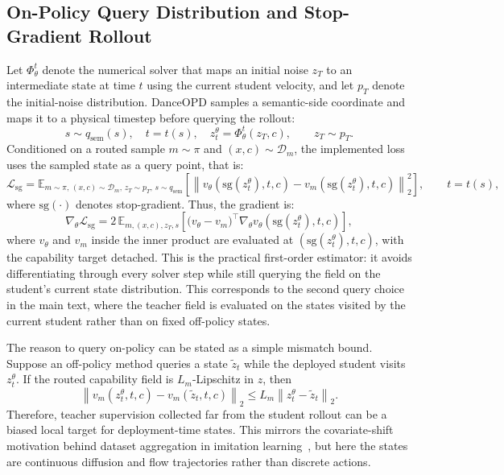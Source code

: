 \documentclass{llmxive}
\begin{document}
\vspace{0.2cm}


\subsection{On-Policy Query Distribution and Stop-Gradient Rollout}
\label{app:onpolicy-sg}

Let $\Phi_\theta^t$ denote the numerical solver that maps an initial noise $z_T$ to an intermediate state at time $t$ using the current student velocity, and let $p_T$ denote the initial-noise distribution. DanceOPD samples a semantic-side coordinate and maps it to a physical timestep before querying the rollout:
\begin{equation}
  s\sim q_{\mathrm{sem}}(s),\quad t=t(s),\quad z_t^\theta=\Phi_\theta^t(z_T,c), \qquad z_T\sim p_T.
  \label{eq:app-onpolicy-query}
\end{equation}
Conditioned on a routed sample $m\sim\pi$ and $(x,c)\sim\mathcal{D}_m$, the implemented loss uses the sampled state as a query point, that is:
\begin{equation}
  \mathcal{L}_{\mathrm{sg}}
  =
  \mathbb{E}_{m\sim\pi,\,(x,c)\sim\mathcal{D}_m,\,z_T\sim p_T,\,s\sim q_{\mathrm{sem}}}\left[
  \left\|
  v_\theta(\mathrm{sg}(z_t^\theta),t,c)
  -v_m(\mathrm{sg}(z_t^\theta),t,c)
  \right\|_2^2
  \right],\qquad t=t(s),
  \label{eq:app-sg-loss}
\end{equation}
where $\mathrm{sg}(\cdot)$ denotes stop-gradient. Thus, the gradient is:
\begin{equation}
  \nabla_\theta\mathcal{L}_{\mathrm{sg}}
  =
  2\,\mathbb{E}_{m,(x,c),z_T,s}\left[
  \bigl(v_\theta-v_m\bigr)^\top
  \nabla_\theta v_\theta(\mathrm{sg}(z_t^\theta),t,c)
  \right],
  \label{eq:app-sg-grad}
\end{equation}
where $v_\theta$ and $v_m$ inside the inner product are evaluated at $(\mathrm{sg}(z_t^\theta),t,c)$, with the capability target detached. This is the practical first-order estimator: it avoids differentiating through every solver step while still querying the field on the student's current state distribution. This corresponds to the second query choice in the main text, where the teacher field is evaluated on the states visited by the current student rather than on fixed off-policy states.

The reason to query on-policy can be stated as a simple mismatch bound. Suppose an off-policy method queries a state $\tilde z_t$ while the deployed student visits $z_t^\theta$. If the routed capability field is $L_m$-Lipschitz in $z$, then
\begin{equation}
  \left\|v_m(z_t^\theta,t,c)-v_m(\tilde z_t,t,c)\right\|_2
  \le L_m\left\|z_t^\theta-\tilde z_t\right\|_2.
  \label{eq:app-offpolicy-bound}
\end{equation}
Therefore, teacher supervision collected far from the student rollout can be a biased local target for deployment-time states. This mirrors the covariate-shift motivation behind dataset aggregation in imitation learning~\cite{ross2011reduction}, but here the states are continuous diffusion and flow trajectories rather than discrete actions.
\end{document}
